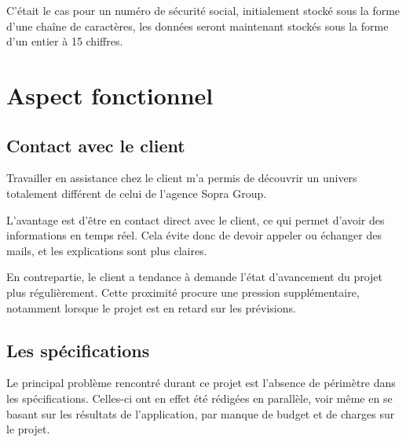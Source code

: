 C'était le cas pour un numéro de sécurité social, initialement stocké sous la forme d'une chaîne de caractères, les données seront maintenant stockés sous la forme d'un entier à 15 chiffres.


\section{Aspect fonctionnel}


\subsection{Contact avec le client}

Travailler en assistance chez le client m'a permis de découvrir un univers totalement différent de celui de l'agence Sopra Group.

L'avantage est d'être en contact direct avec le client, ce qui permet d'avoir des informations en temps réel. Cela évite donc de devoir appeler ou échanger des mails, et les explications sont plus claires.

En contrepartie, le client a tendance à demande l'état d'avancement du projet plus régulièrement.
Cette proximité procure une pression supplémentaire, notamment lorsque le projet est en retard sur les prévisions.


\subsection{Les spécifications}

Le principal problème rencontré durant ce projet est l'absence de périmètre dans les spécifications.
Celles-ci ont en effet été rédigées en parallèle, voir même en se basant sur les résultats de l'application, par manque de budget et de charges sur le projet.

